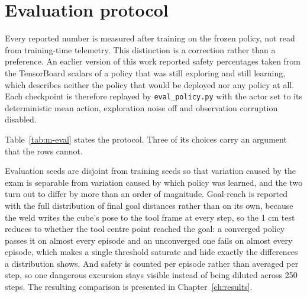 \section{Evaluation protocol}\label{sec:m-eval}

Every reported number is measured after training on the frozen policy, not read from training-time
telemetry. This distinction is a correction rather than a preference. An earlier version of this work
reported safety percentages taken from the TensorBoard scalars of a policy that was still exploring
and still learning, which describes neither the policy that would be deployed nor any policy at all.
Each checkpoint is therefore replayed by \texttt{eval\_policy.py} with the actor set to its
deterministic mean action, exploration noise off and observation corruption disabled.

Table~\ref{tab:m-eval} states the protocol. Three of its choices carry an argument that the rows
cannot.

Evaluation seeds are disjoint from training seeds so that variation caused by the exam is separable
from variation caused by which policy was learned, and the two turn out to differ by more than an
order of magnitude. Goal-reach is reported with the full distribution of final goal distances rather
than on its own, because the weld writes the cube's pose to the tool frame at every step, so the 1 cm
test reduces to whether the tool centre point reached the goal: a converged policy passes it on
almost every episode and an unconverged one fails on almost every episode, which makes a single
threshold saturate and hide exactly the differences a distribution shows. And safety is counted per
episode rather than averaged per step, so one dangerous excursion stays visible instead of being
diluted across 250 steps. The resulting comparison is presented in Chapter~\ref{ch:results}.

